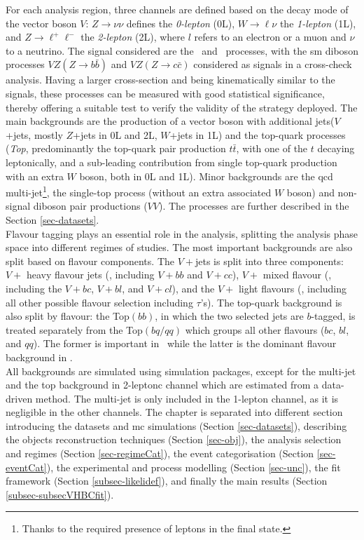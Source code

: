 For each analysis region, three channels are defined based on the decay mode of the vector boson $V$: $Z \rightarrow \nu \nu$ defines the \textit{0-lepton} (0L), $W \rightarrow \ell \nu $ the \textit{1-lepton} (1L), and $Z \rightarrow\ell^+\ell^-$ the \textit{2-lepton} (2L), where $l$ refers to an electron or a muon and $\nu$ to a neutrino. The signal considered are the  \vhb\ and \vhc\ processes, with the \gls{sm} diboson processes $VZ (Z\rightarrow b\bar{b})$ and $VZ (Z\rightarrow c\bar{c})$ considered as signals in a cross-check analysis. Having a larger cross-section and being kinematically similar to the signals, these processes can be measured with good statistical significance, thereby offering a suitable test to verify the validity of the strategy deployed. The main backgrounds are the production of a vector boson with additional jets($V$+jets, mostly $Z$+jets in 0L and 2L, $W$+jets in 1L) and the top-quark processes (\textit{Top}, predominantly the top-quark pair production $t\bar{t}$, with one of the $t$ decaying leptonically, and a sub-leading contribution from single top-quark production with an extra $W$ boson, both in 0L and 1L). Minor backgrounds are the \gls{qcd} multi-jet\footnote{Thanks to the required presence of leptons in the final state.}, the single-top process (without an extra associated $W$ boson) and non-signal diboson pair productions ($VV$). The processes are further described in the Section \ref{sec-datasets}. \\ 

Flavour tagging plays an essential role in the analysis, splitting the analysis phase space into different regimes of studies. The most important backgrounds are also split based on flavour components. The $V+$jets is split into three components: $V+$ heavy flavour jets (\vhf, including $V+bb$ and $V+cc$), $V+$ mixed flavour (\vmf, including the $V+bc$, $V+bl$, and $V+cl$), and the $V+$ light flavours (\vlf, including all other possible flavour selection including $\tau$'s). The top-quark background is also split by flavour: the Top$(bb)$, in which the two selected jets are $b$-tagged, is treated separately from the Top$(bq/qq)$ which groups all other flavours ($bc$, $bl$, and $qq$). The former is important in \vhb\ while the latter is the dominant flavour background in \vhc. \\

All backgrounds are simulated using  simulation packages, except for the multi-jet and the top background in 2-leptonc channel which are estimated from a data-driven method. The multi-jet is only included in the 1-lepton channel, as it is negligible in the other channels. The chapter is separated into different section introducing the datasets and \gls{mc} simulations (Section \ref{sec-datasets}), describing the objects reconstruction techniques (Section \ref{sec-obj}), the analysis selection and regimes (Section \ref{sec-regimeCat}), the event categorisation (Section \ref{sec-eventCat}), the experimental and process modelling (Section \ref{sec-unc}), the fit framework (Section \ref{subsec-likelidef}), and finally the main results (Section \ref{subsec-subsecVHBCfit}).

